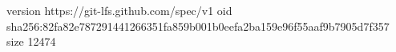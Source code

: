 version https://git-lfs.github.com/spec/v1
oid sha256:82fa82e787291441266351fa859b001b0eefa2ba159e96f55aaf9b7905d7f357
size 12474

